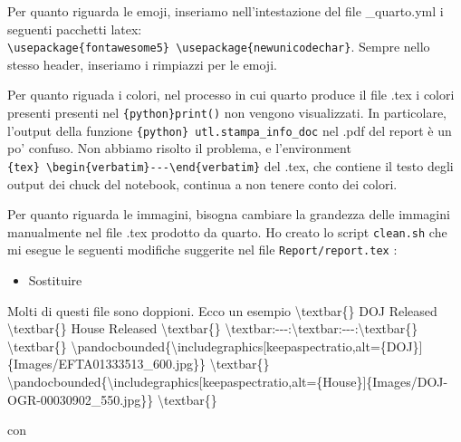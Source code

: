 \documentclass[
  italian,
  a4paper,
]{article}
\newenvironment{Shaded}{\begin{snugshade}}{\end{snugshade}}
\newcommand{\NormalTok}[1]{\textcolor[rgb]{0.00,0.23,0.31}{#1}}
\providecommand{\tightlist}{%
  \setlength{\itemsep}{0pt}\setlength{\parskip}{0pt}}
\begin{document}
Per quanto riguarda le emoji, inseriamo nell'intestazione del file
\_quarto.yml i seguenti pacchetti latex:
\texttt{\textbackslash{}usepackage\{fontawesome5\}\ \textbackslash{}usepackage\{newunicodechar\}}.
Sempre nello stesso header, inseriamo i rimpiazzi per le emoji.

Per quanto riguada i colori, nel processo in cui quarto produce il file
.tex i colori presenti presenti nel
\texttt{\{python\}print(\textquotesingle{}\textquotesingle{})} non
vengono visualizzati. In particolare, l'output della funzione
\texttt{\{python\}\ utl.stampa\_info\_doc} nel .pdf del report è un po'
confuso. Non abbiamo risolto il problema, e l'environment
\texttt{\{tex\}\ \textbackslash{}begin\{verbatim\}-\/-\/-\textbackslash{}end\{verbatim\}}
del .tex, che contiene il testo degli output dei chuck del notebook,
continua a non tenere conto dei colori.

Per quanto riguarda le immagini, bisogna cambiare la grandezza delle
immagini manualmente nel file .tex prodotto da quarto. Ho creato lo
script \texttt{clean.sh} che mi esegue le seguenti modifiche suggerite
nel file \texttt{Report/report.tex} :

\begin{itemize}
\tightlist
\item
  Sostituire\scriptsize
\end{itemize}

\begin{Shaded}
\begin{Highlighting}[]
\NormalTok{Molti di questi file sono doppioni. Ecco un esempio \textbackslash{}textbar\{\} DOJ}
\NormalTok{Released \textbackslash{}textbar\{\} House Released \textbackslash{}textbar\{\}}
\NormalTok{\textbackslash{}textbar:{-}{-}{-}:\textbackslash{}textbar:{-}{-}{-}:\textbackslash{}textbar\{\} \textbackslash{}textbar\{\}}
\NormalTok{\textbackslash{}pandocbounded\{\textbackslash{}includegraphics[keepaspectratio,alt=\{DOJ\}]\{Images/EFTA01333513\_600.jpg\}\}}
\NormalTok{\textbackslash{}textbar\{\}}
\NormalTok{\textbackslash{}pandocbounded\{\textbackslash{}includegraphics[keepaspectratio,alt=\{House\}]\{Images/DOJ{-}OGR{-}00030902\_550.jpg\}\}}
\NormalTok{\textbackslash{}textbar\{\}}
\end{Highlighting}
\end{Shaded}

\normalsize con \scriptsize
\end{document}
